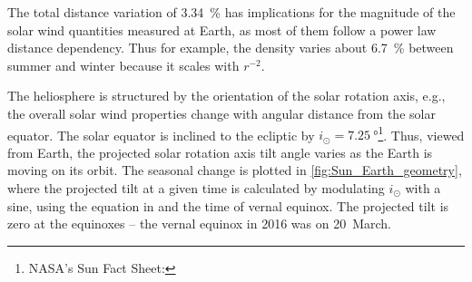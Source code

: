 The total distance variation of \SI{3.34}{\%} has implications for the magnitude of the solar wind quantities measured at Earth, as most of them follow a power law distance dependency. Thus for example, the density varies about \SI{6.7}{\percent} between summer and winter because it scales with $r^{-2}$.


% 


The heliosphere is structured by the orientation of the solar rotation axis, e.g., the overall solar wind properties change with angular distance from the solar equator. The solar equator is inclined to the ecliptic by $i_\odot = \SI{7.25}{\degree}$\footnote{NASA's Sun Fact Sheet: }. Thus, viewed from Earth, the projected solar rotation axis tilt angle varies as the Earth is moving on its orbit. The seasonal change is plotted in \autoref{fig:Sun_Earth_geometry}, where the projected tilt at a given time is calculated by modulating $i_\odot$ with a sine, using the equation in \citet{Hapgood1992} and the time of vernal equinox. The projected tilt is zero at the equinoxes -- the vernal equinox in 2016 was on 20~March.


